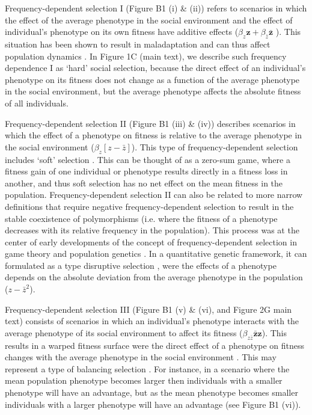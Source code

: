\documentclass{article}
\begin{document}
Frequency-dependent selection I (Figure B1 (i) \& (ii)) refers to scenarios in which the effect of the average phenotype in the social environment and the effect of individual's phenotype on its own fitness have additive effects ($\beta_z \mathbf{z} + \beta_{\bar{z}} \mathbf{\bar{z}}$ ). This situation has been shown to result in maladaptation \citep{Lande1976} and can thus affect population dynamics \citep{Lande2007}. In Figure 1C (main text), we describe such frequency dependence I as 
`hard' social selection, because the direct effect of an individual's phenotype on its fitness does not change as a function of the average phenotype in the social environment, but the average phenotype affects the absolute fitness of all individuals. 

Frequency-dependent selection II (Figure B1 (iii) \& (iv)) describes scenarios in which the effect of a phenotype on fitness is relative to the average phenotype in the social environment ($\beta_z [z-\bar{z}]$). This type of frequency-dependent selection includes `soft' selection \citep{Wallace1975, Bell2021}. This can be thought of as a zero-sum game, where a fitness gain of one individual or phenotype results directly in a fitness loss in another, and thus soft selection has no net effect on the mean fitness in the population. Frequency-dependent selection II can also be related to more narrow definitions that require negative frequency-dependent selection to result in the stable coexistence of polymorphisms (i.e. where the fitness of a phenotype decreases with its relative frequency in the population). This process was at the center of early developments of the concept of frequency-dependent selection in game theory and population genetics \citep{MaynardSmith1982, McGill2007, Gromko1977, Ayala1974, Heino1998}. In a quantitative genetic framework, it can formulated as a type disruptive selection \citep{Burger2004}, were the effects of a phenotype depends on the absolute deviation from the average phenotype in the population ($z-\bar{z}^2$). 

Frequency-dependent selection III (Figure B1 (v) \& (vi), and Figure 2G main text) consists of scenarios in which an individual's phenotype interacts with the average phenotype of its social environment to affect its fitness ($\beta_{z\bar{z}} \mathbf{\bar{z}z}$). This results in a warped fitness surface were the direct effect of a phenotype on fitness changes with the average phenotype in the social environment \citep{Araya-Ajoy2020}. This may represent a type of balancing selection \citep{Gromko1977}. For instance, in a scenario where the mean population phenotype becomes larger then individuals with a smaller phenotype will have an advantage, but as the mean phenotype becomes smaller individuals with a larger phenotype will have an advantage (see Figure B1 (vi)).
\end{document}
